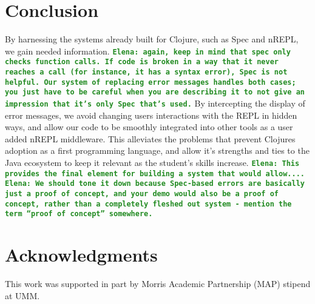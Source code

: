\documentclass[12pt]{article}
\newcommand{\comment}[1]{{\bf \tt  {#1}}}
\newcommand{\emcomment}[1]{\textcolor{ForestGreen}{\comment{Elena: {#1}}}}
\begin{document}
\section{Conclusion}
By harnessing the systems already built for Clojure,
such as Spec and nREPL, we gain needed information.
\emcomment{again, keep in mind that spec only checks function calls. If code is broken
in a way that it never reaches a call (for instance, it has a syntax error), Spec is not helpful.
Our system of replacing error messages handles both cases; you just have to be careful
when you are describing it to not give an impression that it's only Spec that's used.}
By intercepting the display of error messages, we avoid changing users
interactions with the REPL in hidden ways, and allow our code to
be smoothly integrated into other tools as a user added nREPL middleware.
  This alleviates the problems that prevent Clojures
 adoption as a first programming language, and allow it's strengths
 and ties to the Java ecosystem to keep it relevant as the student's skills increase.
\emcomment{This provides the final element for building a system that would allow....}
\emcomment{We should tone it down because Spec-based errors are basically just a proof of concept,
and your demo would also be a proof of concept, rather than a completely fleshed out system - mention the term ``proof of concept'' somewhere.}





\section{Acknowledgments}
This work was supported in part by Morris Academic Partnership (MAP) stipend at UMM.




\end{document}
